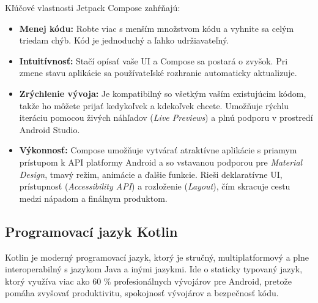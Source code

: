 Kľúčové vlastnosti Jetpack Compose zahŕňajú:
\begin{itemize}
    \item \textbf{Menej kódu:} Robte viac s menším množstvom kódu a vyhnite sa celým triedam chýb. Kód je jednoduchý a ľahko udržiavateľný.
    \item \textbf{Intuitívnosť:} Stačí opísať vaše UI a Compose sa postará o zvyšok. Pri zmene stavu aplikácie sa používateľské rozhranie automaticky aktualizuje.
    \item \textbf{Zrýchlenie vývoja:} Je kompatibilný so všetkým vaším existujúcim kódom, takže ho môžete prijať kedykoľvek a kdekoľvek chcete. Umožňuje rýchlu iteráciu pomocou živých náhľadov (\textit{Live Previews}) a plnú podporu v prostredí Android Studio.
    \item \textbf{Výkonnosť:} Compose umožňuje vytvárať atraktívne aplikácie s priamym prístupom k API platformy Android a so vstavanou podporou pre \textit{Material Design}, tmavý režim, animácie a ďalšie funkcie. Rieši deklaratívne UI, prístupnosť (\textit{Accessibility API}) a rozloženie (\textit{Layout}), čím skracuje cestu medzi nápadom a finálnym produktom.
\end{itemize}

\subsection{Programovací jazyk Kotlin}
Kotlin je moderný programovací jazyk, ktorý je stručný, multiplatformový a plne interoperabilný s 
jazykom Java a inými jazykmi. Ide o staticky typovaný jazyk, ktorý využíva viac ako 60 \% profesionálnych
 vývojárov pre Android, pretože pomáha zvyšovať produktivitu, spokojnosť vývojárov a bezpečnosť kódu.

